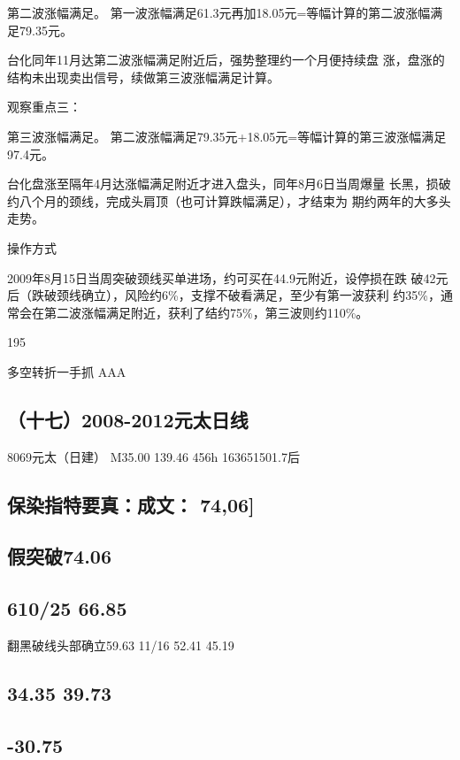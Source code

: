 \documentclass{article}
\begin{document}
第二波涨幅满足。 第一波涨幅满足61.3元再加18.05元=等幅计算的第二波涨幅满足79.35元。

台化同年11月达第二波涨幅满足附近后，强势整理约一个月便持续盘 涨，盘涨的结构未出现卖出信号，续做第三波涨幅满足计算。

观察重点三：

第三波涨幅满足。 第二波涨幅满足79.35元+18.05元=等幅计算的第三波涨幅满足97.4元。

台化盘涨至隔年4月达涨幅满足附近才进入盘头，同年8月6日当周爆量 长黑，损破约八个月的颈线，完成头肩顶（也可计算跌幅满足），才结束为 期约两年的大多头走势。

操作方式

2009年8月15日当周突破颈线买单进场，约可买在44.9元附近，设停损在跌 破42元后（跌破颈线确立），风险约6\%，支撑不破看满足，至少有第一波获利 约35\%，通常会在第二波涨幅满足附近，获利了结约75\%，第三波则约110\%。

195

\clearpage

多空转折一手抓 AAA

\subsection{（十七）2008-2012元太日线}

8069元太（日建） M35.00 139.46 456h 163651501.7后

\subsection{保染指特要真：成文： 74,06]}

\subsection{假突破74.06}

\subsection{610/25 66.85}

翻黑破线头部确立59.63 11/16 52.41 45.19

\subsection{34.35 39.73}

\subsection{-30.75}
\end{document}

